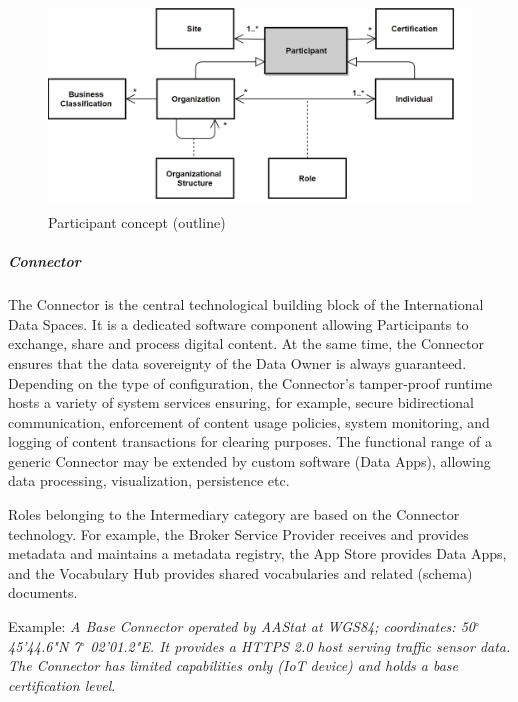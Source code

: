 \begin{figure}[H]
	\begin{Center}
		\includegraphics[width=4.68in,height=2.15in]{./media/image49.png}
		\caption{Participant concept (outline)}
		\label{fig:Participant_concept_outline}
	\end{Center}
\end{figure}



\subparagraph*{Connector}
The Connector is the central technological building block of the International Data Spaces. It is a dedicated software component allowing Participants to exchange, share and process digital content. At the same time, the Connector ensures that the data sovereignty of the Data Owner is always guaranteed. Depending on the type of configuration, the Connector’s tamper-proof runtime hosts a variety of system services ensuring, for example, secure bidirectional communication, enforcement of content usage policies, system monitoring, and logging of content transactions for clearing purposes. The functional range of a generic Connector may be extended by custom software (Data Apps), allowing data processing, visualization, persistence etc. 

Roles belonging to the Intermediary category are based on the Connector technology. For example, the Broker Service Provider receives and provides metadata and maintains a metadata registry, the App Store provides Data Apps, and the Vocabulary Hub provides shared vocabularies and related (schema) documents. 

Example: \textit{A Base Connector operated by AAStat at WGS84; coordinates: 50$ ^{\circ} $ 45'44.6"N 7$ ^{\circ} $ 02'01.2"E. It provides a HTTPS 2.0 host serving traffic sensor data. The Connector has limited capabilities only (IoT device) and holds a base certification level}. 

